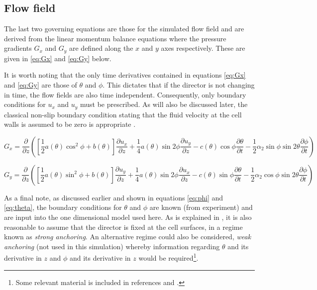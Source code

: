 \subsection{Flow field}
The last two governing equations are those for the simulated flow field and are derived from the linear momentum balance equations \cite{Cornford2008} where the pressure gradients $G_x$ and $G_y$ are defined along the $x$ and $y$ axes respectively. These are given in \ref{eq:Gx} and \ref{eq:Gy} below.

It is worth noting that the only time derivatives contained in equations \ref{eq:Gx} and \ref{eq:Gy} are those of $\theta$ and $\phi$. This dictates that if the director is not changing in time, the flow fields are also time independent. 
Consequently, only boundary conditions for $u_x$ and $u_y$ must be prescribed. As will also be discussed later, the classical non-slip boundary condition stating that the fluid velocity at the cell walls is assumed to be zero is appropriate \cite{Cornford2008,Feynmann1964}.



\begin{equation}
G_x = \frac{\partial}{\partial z}\left(\left[\frac{1}{2}a\left(\theta\right)\cos^2\phi+b\left(\theta\right)\right]\frac{\partial u_x}{\partial z}
+\frac{1}{4}a\left(\theta\right)\sin2\phi\frac{\partial u_y}{\partial z}-c\left(\theta\right)\cos\phi\frac{\partial \theta}{\partial t}-\frac{1}{2}\alpha_2\sin\phi\sin2\theta\frac{\partial \phi}{\partial t}\right)
\label{eq:Gx}
\end{equation}



\begin{equation}
G_y = \frac{\partial}{\partial z}\left(\left[\frac{1}{2}a\left(\theta\right)\sin^2\phi+b\left(\theta\right)\right]\frac{\partial u_y}{\partial z}
+\frac{1}{4}a\left(\theta\right)\sin2\phi\frac{\partial u_x}{\partial z}-c\left(\theta\right)\sin\phi\frac{\partial \theta}{\partial t}-\frac{1}{2}\alpha_2\cos\phi\sin2\theta\frac{\partial \phi}{\partial t}\right)
\label{eq:Gy}
\end{equation}

\noindent As a final note, as discussed earlier and shown in equations \ref{eq:phi} and \ref{eq:theta}, the boundary conditions for $\theta$ and $\phi$ are known (from experiment) and are input into the one dimensional model used here. As is explained in \cite{Cornford2008}, it is also reasonable to assume that the director is fixed at the cell surfaces, in a regime known as \textit{strong anchoring}. An alternative regime could also be considered, \textit{weak anchoring} (not used in this simulation) whereby information regarding $\theta$ and its derivative in $z$ and $\phi$ and its derivative in $z$ would be required\footnote{Some relevant material is included in references \cite{Cui2006} and \cite{Choate2008}.}.

